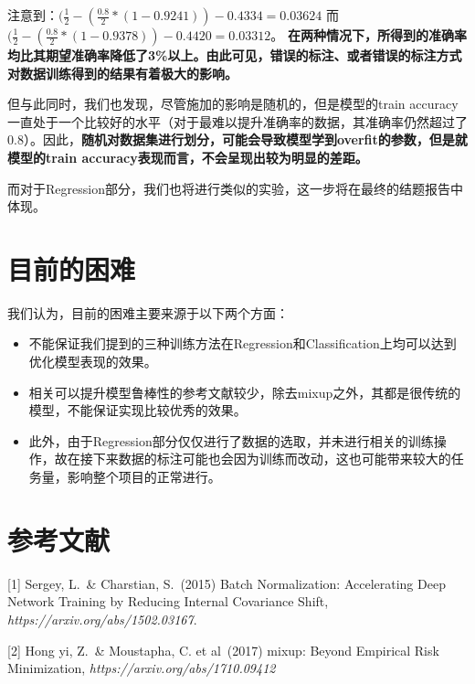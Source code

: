 \documentclass{article}
\begin{document}
注意到：$(\frac{1}{2} - (\frac{0.8}{2} * (1 - 0.9241))- 0.4334 = 0.03624$
而$(\frac{1}{2} - (\frac{0.8}{2} * (1 - 0.9378))- 0.4420 = 0.03312$。
\textbf{在两种情况下，所得到的准确率均比其期望准确率降低了3\%以上。由此可见，错误的标注、或者错误的标注方式对数据训练得到的结果有着极大的影响。}

但与此同时，我们也发现，尽管施加的影响是随机的，但是模型的train accuracy一直处于一个比较好的水平（对于最难以提升准确率的数据，其准确率仍然超过了0.8）。因此，\textbf{随机对数据集进行划分，可能会导致模型学到overfit的参数，但是就模型的train accuracy表现而言，不会呈现出较为明显的差距。}

而对于Regression部分，我们也将进行类似的实验，这一步将在最终的结题报告中体现。

\section{目前的困难}

我们认为，目前的困难主要来源于以下两个方面：

\begin{itemize}
    \item 不能保证我们提到的三种训练方法在Regression和Classification上均可以达到优化模型表现的效果。
    \item 相关可以提升模型鲁棒性的参考文献较少，除去mixup之外，其都是很传统的模型，不能保证实现比较优秀的效果。
    \item 此外，由于Regression部分仅仅进行了数据的选取，并未进行相关的训练操作，故在接下来数据的标注可能也会因为训练而改动，这也可能带来较大的任务量，影响整个项目的正常进行。
\end{itemize}

\section*{参考文献}

\medskip

\small

[1] Sergey, L.\ \& Charstian, S.\ (2015) Batch Normalization: Accelerating Deep Network Training by Reducing Internal Covariance Shift, {\it https://arxiv.org/abs/1502.03167}.

[2] Hong yi, Z.\ \& Moustapha, C. et al\ (2017) mixup: Beyond Empirical Risk Minimization, {\it https://arxiv.org/abs/1710.09412}
\end{document}
